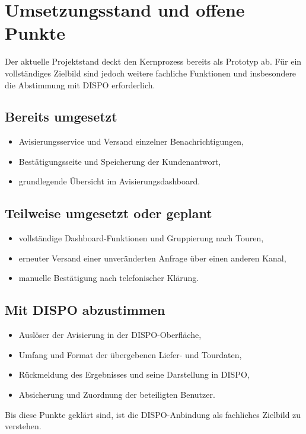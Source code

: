 \clearpage
\section{Umsetzungsstand und offene Punkte}

Der aktuelle Projektstand deckt den Kernprozess bereits als Prototyp ab. Für ein vollständiges
Zielbild sind jedoch weitere fachliche Funktionen und insbesondere die Abstimmung mit DISPO
erforderlich.

\subsection*{Bereits umgesetzt}

\begin{itemize}
  \item Avisierungsservice und Versand einzelner Benachrichtigungen,
  \item Bestätigungsseite und Speicherung der Kundenantwort,
  \item grundlegende Übersicht im Avisierungsdashboard.
\end{itemize}

\subsection*{Teilweise umgesetzt oder geplant}

\begin{itemize}
  \item vollständige Dashboard-Funktionen und Gruppierung nach Touren,
  \item erneuter Versand einer unveränderten Anfrage über einen anderen Kanal,
  \item manuelle Bestätigung nach telefonischer Klärung.
\end{itemize}

\subsection*{Mit DISPO abzustimmen}

\begin{itemize}
  \item Auslöser der Avisierung in der DISPO-Oberfläche,
  \item Umfang und Format der übergebenen Liefer- und Tourdaten,
  \item Rückmeldung des Ergebnisses und seine Darstellung in DISPO,
  \item Absicherung und Zuordnung der beteiligten Benutzer.
\end{itemize}

Bis diese Punkte geklärt sind, ist die DISPO-Anbindung als fachliches Zielbild zu verstehen.
